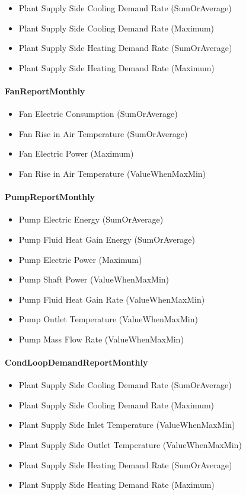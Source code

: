 \begin{itemize}
\item
  Plant Supply Side Cooling Demand Rate (SumOrAverage)
\item
  Plant Supply Side Cooling Demand Rate (Maximum)
\item
  Plant Supply Side Heating Demand Rate (SumOrAverage)
\item
  Plant Supply Side Heating Demand Rate (Maximum)
\end{itemize}

\paragraph{FanReportMonthly}\label{fanreportmonthly}

\begin{itemize}
\item
  Fan Electric Consumption (SumOrAverage)
\item
  Fan Rise in Air Temperature (SumOrAverage)
\item
  Fan Electric Power (Maximum)
\item
  Fan Rise in Air Temperature (ValueWhenMaxMin)
\end{itemize}

\paragraph{PumpReportMonthly}\label{pumpreportmonthly}

\begin{itemize}
\item
  Pump Electric Energy (SumOrAverage)
\item
  Pump Fluid Heat Gain Energy (SumOrAverage)
\item
  Pump Electric Power (Maximum)
\item
  Pump Shaft Power (ValueWhenMaxMin)
\item
  Pump Fluid Heat Gain Rate (ValueWhenMaxMin)
\item
  Pump Outlet Temperature (ValueWhenMaxMin)
\item
  Pump Mass Flow Rate (ValueWhenMaxMin)
\end{itemize}

\paragraph{CondLoopDemandReportMonthly}\label{condloopdemandreportmonthly}

\begin{itemize}
\item
  Plant Supply Side Cooling Demand Rate (SumOrAverage)
\item
  Plant Supply Side Cooling Demand Rate (Maximum)
\item
  Plant Supply Side Inlet Temperature (ValueWhenMaxMin)
\item
  Plant Supply Side Outlet Temperature (ValueWhenMaxMin)
\item
  Plant Supply Side Heating Demand Rate (SumOrAverage)
\item
  Plant Supply Side Heating Demand Rate (Maximum)
\end{itemize}

